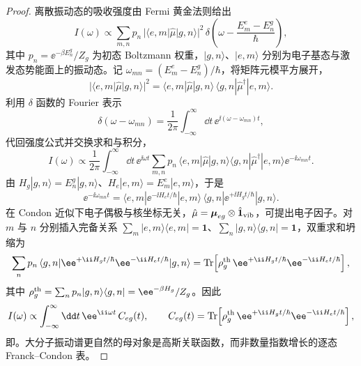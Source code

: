 \begin{proof}
离散振动态的吸收强度由 Fermi 黄金法则给出
\begin{equation*}
I(\omega)\propto
\sum_{m,n} p_n\,
|\langle e,m|\hat\mu|g,n\rangle|^2\,
\delta\!\left(\omega-\frac{E_m^e-E_n^g}{\hbar}\right),
\end{equation*}
其中 $p_n=\ee^{-\beta E_n^g}/Z_g$ 为初态 Boltzmann 权重，$|g,n\rangle$、$|e,m\rangle$ 分别为电子基态与激发态势能面上的振动态。记 $\omega_{mn}=(E_m^e-E_n^g)/\hbar$，将矩阵元模平方展开，
\begin{equation*}
|\langle e,m|\hat\mu|g,n\rangle|^2
= \langle e,m|\hat\mu|g,n\rangle\,
 \langle g,n|\hat\mu^\dagger|e,m\rangle.
\end{equation*}
利用 $\delta$ 函数的 Fourier 表示
\begin{equation*}
\delta(\omega-\omega_{mn})
= \frac1{2\pi}\int_{-\infty}^{\infty}\dd t\,
 \ee^{\ii(\omega-\omega_{mn})t},
\end{equation*}
代回强度公式并交换求和与积分，
\begin{equation*}
I(\omega)\propto
\frac1{2\pi}\int_{-\infty}^{\infty}\dd t\,
\ee^{\ii\omega t}
\sum_{m,n} p_n\,
\langle e,m|\hat\mu|g,n\rangle
\langle g,n|\hat\mu^\dagger|e,m\rangle
\ee^{-\ii\omega_{mn}t}.
\end{equation*}
由 $H_g|g,n\rangle=E_n^g|g,n\rangle$、$H_e|e,m\rangle=E_m^e|e,m\rangle$，于是
\begin{equation*}
\ee^{-\ii\omega_{mn}t}
= \langle e,m|\ee^{-\ii H_e t/\hbar}|e,m\rangle\,
 \langle g,n|\ee^{+\ii H_g t/\hbar}|g,n\rangle.
\end{equation*}
在 Condon 近似下电子偶极与核坐标无关，$\hat\mu=\boldsymbol\mu_{eg}\otimes\hat{\mathbf 1}_{\rm vib}$，可提出电子因子。对 $m$ 与 $n$ 分别插入完备关系 $\sum_m|e,m\rangle\langle e,m|=\mathbf 1$、$\sum_n|g,n\rangle\langle g,n|=\mathbf 1$，双重求和坍缩为
\begin{equation*}
\sum_n p_n\,
\langle g,n|\ee^{+\ii H_g t/\hbar}\ee^{-\ii H_e t/\hbar}|g,n\rangle
= \operatorname{Tr}\!\left[
 \rho_g^{\rm th}\,
 \ee^{+\ii H_g t/\hbar}\ee^{-\ii H_e t/\hbar}\right],
\end{equation*}
其中 $\rho_g^{\rm th}=\sum_n p_n|g,n\rangle\langle g,n|=\ee^{-\beta H_g}/Z_g$。因此
\begin{equation*}
I(\omega)\propto
\int_{-\infty}^{\infty}\dd t\,
\ee^{\ii\omega t}\,
C_{eg}(t),
\qquad
C_{eg}(t)=\operatorname{Tr}\!\left[
\rho_g^{\rm th}\,
\ee^{+\ii H_g t/\hbar}\ee^{-\ii H_e t/\hbar}\right],
\end{equation*}
即。大分子振动谱更自然的母对象是高斯关联函数，而非数量指数增长的逐态 Franck--Condon 表。
\end{proof}

